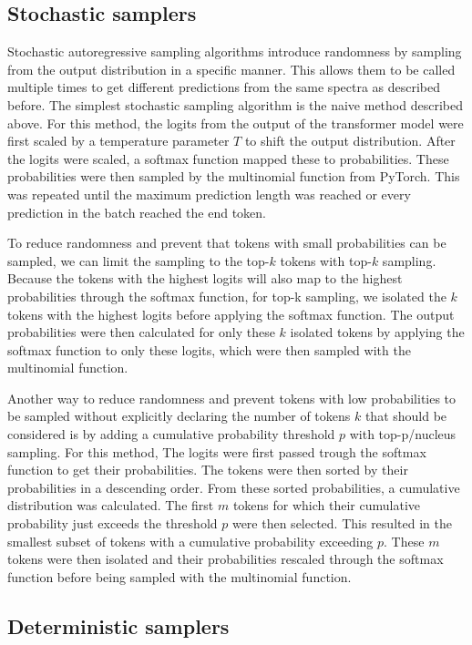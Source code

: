 \subsection{Stochastic samplers}
\label{sec:stochastic_samplers}

Stochastic autoregressive sampling algorithms introduce randomness by sampling from the output distribution in a specific manner.
This allows them to be called multiple times to get different predictions from the same spectra as described before.
The simplest stochastic sampling algorithm is the naive method described above.
For this method, the logits from the output of the transformer model were first scaled by a temperature parameter $T$ to shift the output distribution.
After the logits were scaled, a softmax function mapped these to probabilities.
These probabilities were then sampled by the multinomial function from PyTorch.
This was repeated until the maximum prediction length was reached or every prediction in the batch reached the end token.

To reduce randomness and prevent that tokens with small probabilities can be sampled, we can limit the sampling to the top-$k$ tokens with top-$k$ sampling.
Because the tokens with the highest logits will also map to the highest probabilities through the softmax function,
for top-k sampling, we isolated the $k$ tokens with the highest logits before applying the softmax function.
The output probabilities were then calculated for only these $k$ isolated tokens by applying the softmax function to only these logits, which were then sampled with the multinomial function.

Another way to reduce randomness and prevent tokens with low probabilities to be sampled without explicitly declaring the number of tokens $k$ that should be considered is by adding a cumulative probability threshold $p$ with top-p/nucleus sampling.
For this method, The logits were first passed trough the softmax function to get their probabilities.
The tokens were then sorted by their probabilities in a descending order.
From these sorted probabilities, a cumulative distribution was calculated.
The first $m$ tokens for which their cumulative probability just exceeds the threshold $p$ were then selected.
This resulted in the smallest subset of tokens with a cumulative probability exceeding $p$.
These $m$ tokens were then isolated and their probabilities rescaled through the softmax function before being sampled with the multinomial function.

\subsection{Deterministic samplers}

